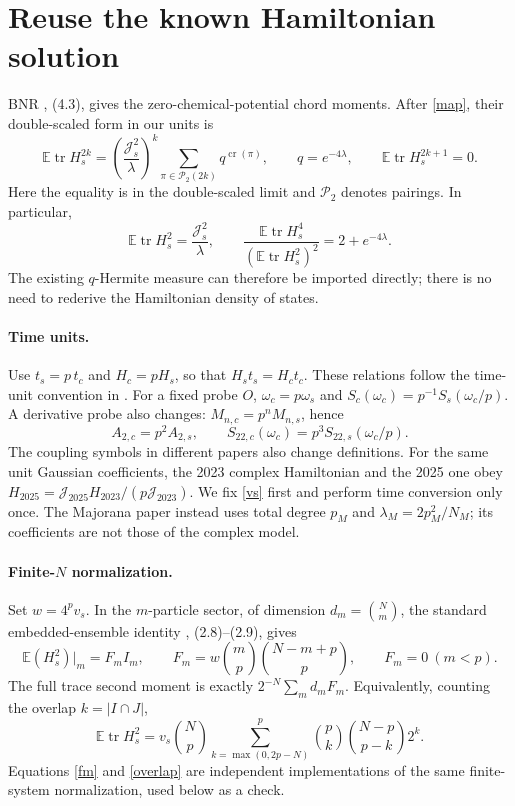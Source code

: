 \documentclass[11pt,a4paper]{article}
\newcommand{\tr}{\operatorname{tr}}
\newcommand{\E}{\mathbb E}
\begin{document}
\newpage
\section{Reuse the known Hamiltonian solution}
BNR \cite{bnr}, (4.3), gives the zero-chemical-potential chord moments.
After \eqref{map}, their double-scaled form in our units is
\begin{equation}
 \E\tr H_s^{2k}
 =\left(\frac{\mathcal J_s^2}{\lambda}\right)^k
   \sum_{\pi\in\mathcal P_2(2k)}q^{\operatorname{cr}(\pi)},
 \qquad q=e^{-4\lambda},\qquad \E\tr H_s^{2k+1}=0.
\end{equation}
Here the equality is in the double-scaled limit and $\mathcal P_2$
denotes pairings. In particular,
\begin{equation}
 \E\tr H_s^2=\frac{\mathcal J_s^2}{\lambda},\qquad
 \frac{\E\tr H_s^4}{(\E\tr H_s^2)^2}=2+e^{-4\lambda}.
\end{equation}
The existing $q$-Hermite measure can therefore be imported directly;
there is no need to rederive the Hamiltonian density of states.

\paragraph{Time units.}
Use $t_s=p\,t_c$ and $H_c=pH_s$, so that $H_st_s=H_ct_c$.
These relations follow the time-unit convention in \cite{qcd,temp}.
For a fixed probe $O$, $\omega_c=p\omega_s$ and
$S_c(\omega_c)=p^{-1}S_s(\omega_c/p)$. A derivative probe also changes:
$M_{n,c}=p^nM_{n,s}$, hence
\begin{equation}
 A_{2,c}=p^2 A_{2,s},\qquad
 S_{22,c}(\omega_c)=p^3 S_{22,s}(\omega_c/p).
\end{equation}
The coupling symbols in different papers also change definitions.
For the same unit Gaussian coefficients, the 2023 complex Hamiltonian
and the 2025 one obey
$H_{2025}=\mathcal J_{2025}H_{2023}/(p\mathcal J_{2023})$.
We fix \eqref{vs} first and perform time conversion only once.
The Majorana paper \cite{qcd} instead uses total degree $p_M$ and
$\lambda_M=2p_M^2/N_M$; its coefficients are not those of the complex model.

\paragraph{Finite-$N$ normalization.}
Set $w=4^pv_s$. In the $m$-particle sector, of dimension $d_m=\binom Nm$,
the standard embedded-ensemble identity \cite{tt}, (2.8)--(2.9), gives
\begin{equation}
 \E(H_s^2)|_m=F_m I_m,\qquad
 F_m=w\binom mp\binom{N-m+p}{p},\qquad F_m=0\ (m<p).\label{fm}
\end{equation}
The full trace second moment is exactly
$2^{-N}\sum_m d_mF_m$. Equivalently, counting the overlap $k=|I\cap J|$,
\begin{equation}
 \E\tr H_s^2=v_s\binom Np
 \sum_{k=\max(0,2p-N)}^p\binom pk\binom{N-p}{p-k}2^k.\label{overlap}
\end{equation}
Equations \eqref{fm} and \eqref{overlap} are independent implementations
of the same finite-system normalization, used below as a check.
\end{document}
